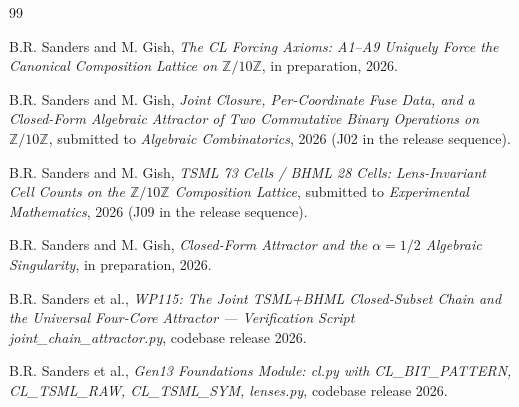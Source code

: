 \documentclass[11pt,reqno]{amsart}
\theoremstyle{definition}
\newcommand{\Z}{\mathbb{Z}}
\begin{document}
\begin{thebibliography}{99}

B.R. Sanders and M. Gish, \emph{The CL Forcing Axioms: A1--A9
Uniquely Force the Canonical Composition Lattice on $\Z/10\Z$},
in preparation, 2026.

B.R. Sanders and M. Gish, \emph{Joint Closure, Per-Coordinate Fuse
Data, and a Closed-Form Algebraic Attractor of Two Commutative
Binary Operations on $\Z/10\Z$}, submitted to \emph{Algebraic
Combinatorics}, 2026 (J02 in the release sequence).

B.R. Sanders and M. Gish, \emph{TSML 73 Cells / BHML 28 Cells:
Lens-Invariant Cell Counts on the $\Z/10\Z$ Composition Lattice},
submitted to \emph{Experimental Mathematics}, 2026 (J09 in the
release sequence).

B.R. Sanders and M. Gish, \emph{Closed-Form Attractor and the
$\alpha = 1/2$ Algebraic Singularity}, in preparation, 2026.

B.R. Sanders et al., \emph{WP115: The Joint TSML+BHML Closed-Subset
Chain and the Universal Four-Core Attractor — Verification
Script joint\_chain\_attractor.py}, codebase release 2026.

B.R. Sanders et al., \emph{Gen13 Foundations Module: cl.py with
CL\_BIT\_PATTERN, CL\_TSML\_RAW, CL\_TSML\_SYM, lenses.py},
codebase release 2026.

\end{thebibliography}
\end{document}
